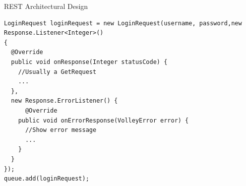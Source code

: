 \begin{frame}[fragile]{REST Architectural Design}
\begin{center}
\begin{minipage}[H]{0.9\linewidth}
\begin{lstlisting}
LoginRequest loginRequest = new LoginRequest(username, password,new Response.Listener<Integer>() 
{
  @Override
  public void onResponse(Integer statusCode) {
    //Usually a GetRequest
    ...
  }, 
  new Response.ErrorListener() {
	  @Override
    public void onErrorResponse(VolleyError error) {
      //Show error message
      ...
    }
  }
});
queue.add(loginRequest);

\end{lstlisting}
\end{minipage}
\end{center}
\end{frame}

